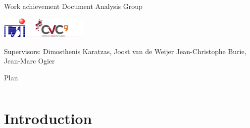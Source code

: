 \documentclass[9pt]{beamer}
\begin{document}



\begin{frame}
	\center Work achievement 
	\center Document Analysis Group\vspace{2em}
	\titlepage
	\thispagestyle{empty}
	\begin{center}
	\end{center}
		\includegraphics[trim= 0mm 0mm 0mm 0mm, clip, width=3em]{image/LogoL3i.png}\hspace{18em}
		\includegraphics[width=3cm]{image/logo_cvc_centrevisio.png}\vspace{1em}

		\tiny	Supervisors: Dimosthenis Karatzas, Joost van de Weijer \hspace{19em}Jean-Christophe Burie, Jean-Marc Ogier 

\end{frame}


\begin{frame} 
	\begin{center}{\Large Plan }\end{center}

	\thispagestyle{empty}
	\begin{columns}[c]
		\column{15em}
		\tableofcontents[hideallsubsections]
		\column{15em}
	\end{columns}

	\setcounter{page}{0}
\end{frame}


\section{Introduction}
\end{document}
